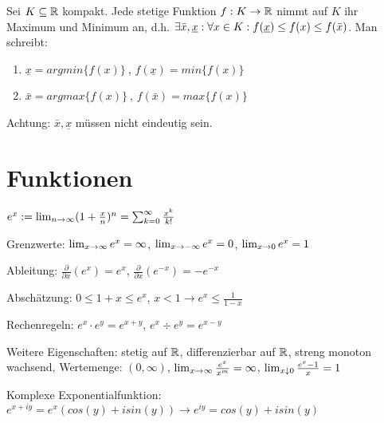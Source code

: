 \begin{satz}
	Sei $K \subseteq \mathbb{R}$ kompakt. Jede stetige Funktion $f : K \rightarrow \mathbb{R}$ nimmt auf $K$ ihr Maximum und Minimum an, d.h. $\exists \bar{x}, \underline{x}: \forall x \in K : f(\underline{x}) \leq f(x) \leq f(\bar{x})$. Man schreibt:
	
	\begin{enumerate}[noitemsep]
		\item $\underline{x} = argmin \{ f(x) \} \medspace$, $f(\underline{x}) = min \{f(x)\}$
		\item $\bar{x} = argmax \{ f(x) \} \medspace$, $f(\bar{x}) = max \{f(x)\}$
	\end{enumerate}

	Achtung: $\bar{x}, \underline{x}$ müssen nicht eindeutig sein.
\end{satz}

\pagebreak

 	
\section{Funktionen}


\begin{definition}[Exponentialfunktion]
	$e^x := \lim_{n \rightarrow \infty} (1 + \frac{x}{n})^n = \sum_{k=0}^{\infty} \frac{x^k}{k!}$
	\begin{description} [noitemsep]
		\item Grenzwerte: $\lim_{x \rightarrow \infty} e^x = \infty$, $\lim_{x \rightarrow -\infty} e^x = 0$, $\lim_{x \rightarrow 0} e^x = 1$
		\item Ableitung: $\frac{\partial}{\partial x}(e^x) = e^x$, $\frac{\partial}{\partial x}(e^{-x}) = -e^{-x}$		
		\item Abschätzung: $ 0 \leq 1 + x \leq e^x$,  $x < 1 \rightarrow e^x \leq \frac{1}{1 - x}$ 
		\item Rechenregeln: $e^x \cdot e^y = e^{x+y}$, $e^x \div e^y = e^{x-y}$
		\item Weitere Eigenschaften: stetig auf $\mathbb{R}$, differenzierbar auf $\mathbb{R}$, streng monoton wachsend, Wertemenge: $(0, \infty)$, $\lim_{x \rightarrow \infty} \frac{e^x}{x^m} = \infty$, $\lim_{x \downarrow 0} \frac{e^x - 1}{x} = 1$
		\item Komplexe Exponentialfunktion: $e^{x+iy} = e^x(cos(y) + i sin(y)) \rightarrow e^{iy} = cos(y) + i sin(y)$
	\end{description}
\end{definition}

